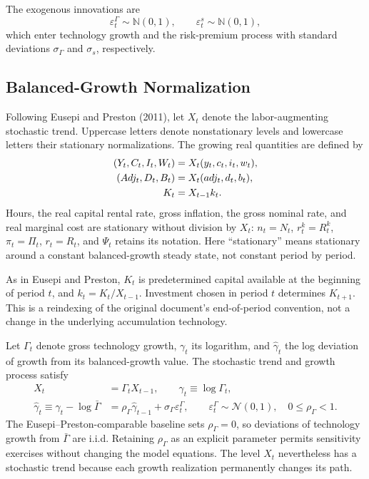 \documentclass[12pt,final]{article}
\begin{document}
The exogenous innovations are
\begin{equation*}
  \varepsilon_t^\Gamma \sim \mathbb{N}(0,1),
  \qquad
  \varepsilon_t^s \sim \mathbb{N}(0,1),
\end{equation*}
which enter technology growth and the risk-premium process with standard
deviations $\sigma_\Gamma$ and $\sigma_s$, respectively.

\subsection{Balanced-Growth Normalization}
\label{sec:bgp-normalization}

Following Eusepi and Preston (2011), let $X_t$ denote the labor-augmenting
stochastic trend.  Uppercase letters denote nonstationary levels and
lowercase letters their stationary normalizations.  The growing real quantities
are defined by
\begin{align}
  (Y_t,C_t,I_t,W_t) & =X_t(y_t,c_t,i_t,w_t), \notag \\
  (Adj_t,D_t,B_t)   & =X_t(adj_t,d_t,b_t),
  \label{eq:growing-normalizations}                 \\
  K_t               & =X_{t-1}k_t.
  \label{eq:capital-normalization}
\end{align}
Hours, the real capital rental rate, gross inflation, the gross nominal rate,
and real marginal cost are stationary without division by $X_t$:
$n_t=N_t$, $r_t^k=R_t^k$, $\pi_t=\Pi_t$, $r_t=R_t$, and $\Psi_t$ retains its
notation.  Here ``stationary'' means stationary around a constant
balanced-growth steady state, not constant period by period.

As in Eusepi and Preston, $K_t$ is predetermined capital available at the
beginning of period $t$, and $k_t=K_t/X_{t-1}$.  Investment chosen in period $t$
determines $K_{t+1}$.  This is a reindexing of the original document's
end-of-period convention, not a change in the underlying accumulation technology.

Let $\Gamma_t$ denote gross technology growth, $\gamma_t$ its logarithm, and
$\widehat\gamma_t$ the log deviation of growth from its balanced-growth value.
The stochastic trend and growth process satisfy
\begin{align}
  X_t & = \Gamma_t X_{t-1},
  \qquad \gamma_t\equiv\log\Gamma_t,
  \label{eq:trend-level}                 \\
  \widehat\gamma_t
  \equiv\gamma_t-\log\bar\Gamma
      & =\rho_\Gamma\widehat\gamma_{t-1}
  +\sigma_\Gamma\varepsilon_t^\Gamma,
  \qquad
  \varepsilon_t^\Gamma\sim\mathcal N(0,1),
  \quad 0\leq\rho_\Gamma<1.
  \label{eq:trend-growth}
\end{align}
The Eusepi--Preston-comparable baseline sets $\rho_\Gamma=0$, so deviations of
technology growth from $\bar\Gamma$ are i.i.d.  Retaining $\rho_\Gamma$ as an
explicit parameter permits sensitivity exercises without changing the
model equations.  The level $X_t$ nevertheless has a stochastic trend because
each growth realization permanently changes its path.
\end{document}
